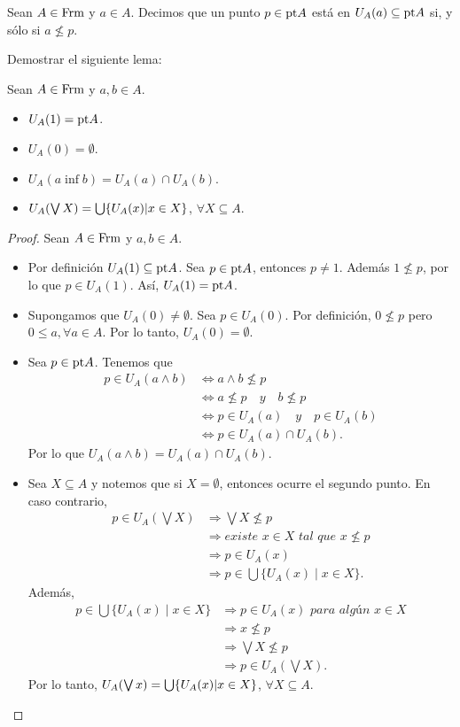 Sean $A\in \mathrm{Frm}$ y $a\in A$. Decimos que un punto $p\in \mathrm{pt} A$ está en $U_A(a)\subseteq \mathrm{pt} A$ si, y sólo si $a\not\leq p$.
\begin{exe}%
Demostrar el siguiente lema:
  \begin{lemma}
    Sean $A\in \mathrm{Frm}$ y $a,b\in A$.
    \begin{itemize}
        \item $U_A(1)=\mathrm{pt} A$.
        \item $U_A(0)=\emptyset$.
        \item $U_A(a\inf b)=U_A(a)\cap U_A(b)$.
        \item $U_A(\bigvee X)=\bigcup \{U_A(x)|x\in X\}$, $\forall X\subseteq A$.
    \end{itemize}
  \end{lemma}
\end{exe}
\begin{proof}
  Sean $A\in \mathrm{Frm}$ y $a,b\in A$.
\begin{itemize}
\item Por definición $U_A(1)\subseteq \mathrm{pt} A$. Sea $p\in \mathrm{pt} A$, entonces $p\neq 1$. Además $1\not\leq p$, por lo que $p\in U_A(1)$. Así, $U_A(1)=\mathrm{pt} A$.
\item Supongamos que $U_A(0)\neq \emptyset$. Sea $p\in U_A(0)$. Por definición, $0\not\leq p$ pero $0\leq a, \forall a\in A$. Por lo tanto, $U_A(0)=\emptyset$.
\item Sea $p\in \mathrm{pt} A$. Tenemos que
\begin{align*}
p\in U_A(a\wedge b)&\iff a\wedge b\not\leq p\\
&\iff a\not\leq p\quad y\quad b\not\leq p\\
&\iff p\in U_A(a)\quad y\quad p\in U_A(b)\\
&\iff p\in U_A(a)\cap U_A(b).
\end{align*}
Por lo que $U_A(a\wedge b)=U_A(a)\cap U_A(b)$.
\item Sea $X\subseteq A$ y notemos que si $X=\emptyset$, entonces ocurre el segundo punto. En caso contrario,
\begin{align*}
p\in U_A(\bigvee X)&\Rightarrow \bigvee X\not\leq p\\
&\Rightarrow \textit{existe }x\in X\textit{ tal que }x\not\leq p\\
&\Rightarrow p\in U_A(x)\\
&\Rightarrow p\in \bigcup \{U_A(x)\mid x\in X\}.
\end{align*}
Además,
\begin{align*}
p\in \bigcup\{U_A(x)\mid x\in X\}&\Rightarrow p\in U_A(x)\textit{ para algún }x\in X\\
&\Rightarrow x\not \leq p\\
&\Rightarrow \bigvee X\not\leq p\\
&\Rightarrow p\in U_A(\bigvee X).
\end{align*}
Por lo tanto, $U_A(\bigvee x)=\bigcup \{U_A(x)|x\in X\}$, $\forall X\subseteq A$.
\end{itemize}
\end{proof}

